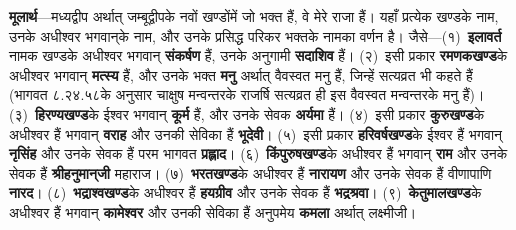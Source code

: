 \begin{sloppypar}\justifying{}
\textbf{मूलार्थ}—मध्यद्वीप अर्थात् जम्बूद्वीपके नवों खण्डोंमें जो भक्त हैं, वे मेरे राजा हैं। यहाँ प्रत्येक खण्डके नाम, उनके अधीश्वर भगवान्‌के नाम, और उनके प्रसिद्ध परिकर भक्तके नामका वर्णन है। जैसे—(१)~\textbf{इलावर्त} नामक खण्डके अधीश्वर भगवान् \textbf{संकर्षण} हैं, उनके अनुगामी \textbf{सदाशिव} हैं। (२)~इसी प्रकार \textbf{रमणक\-खण्ड}के अधीश्वर भगवान् \textbf{मत्स्य} हैं, और उनके भक्त \textbf{मनु} अर्थात् वैवस्वत मनु हैं, जिन्हें सत्यव्रत भी कहते हैं (भागवत ८.२४.५८के अनुसार चाक्षुष मन्वन्तरके राजर्षि सत्यव्रत ही इस वैवस्वत मन्वन्तरके मनु हैं)। (३)~\textbf{हिरण्यखण्ड}के ईश्वर भगवान् \textbf{कूर्म} हैं, और उनके सेवक \textbf{अर्यमा} हैं। (४)~इसी प्रकार \textbf{कुरुखण्ड}के अधीश्वर हैं भगवान् \textbf{वराह} और उनकी सेविका हैं \textbf{भूदेवी}। (५)~इसी प्रकार \textbf{हरिवर्ष\-खण्ड}के ईश्वर हैं भगवान् \textbf{नृसिंह} और उनके सेवक हैं परम भागवत \textbf{प्रह्लाद}। (६)~\textbf{किंपुरुष\-खण्ड}के अधीश्वर हैं भगवान् \textbf{राम} और उनके सेवक हैं \textbf{श्रीहनुमान्‌जी} महाराज। (७)~\textbf{भरतखण्ड}के अधीश्वर हैं \textbf{नारायण} और उनके सेवक हैं वीणापाणि \textbf{नारद}। (८)~\textbf{भद्राश्वखण्ड}के अधीश्वर हैं \textbf{हयग्रीव} और उनके सेवक हैं \textbf{भद्रश्रवा}। (९)~\textbf{केतुमालखण्ड}के अधीश्वर हैं भगवान् \textbf{कामेश्वर} और उनकी सेविका हैं अनुपमेय \textbf{कमला} अर्थात् लक्ष्मीजी।
\end{sloppypar}


